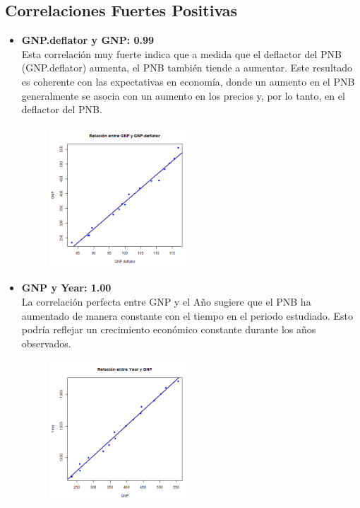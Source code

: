 \documentclass{article}
\begin{document}
    \subsection{Correlaciones Fuertes Positivas}
    
    \begin{itemize}
        \item \textbf{GNP.deflator y GNP: 0.99} \\
        Esta correlación muy fuerte indica que a medida que el deflactor del PNB (GNP.deflator) aumenta, el PNB también tiende a aumentar. Este resultado es coherente con las expectativas en economía, donde un aumento en el PNB generalmente se asocia con un aumento en los precios y, por lo tanto, en el deflactor del PNB.
        
        \begin{figure}[H]
            \centering
            \includegraphics[width=0.5\textwidth]{GraficosDispersion/GNP.deflator_vs_GNP.png}
            \label{fig:GNP.deflator_vs_GNP}
            \vspace{0.5cm} %
        \end{figure}
           

        \item \textbf{GNP y Year: 1.00} \\
        La correlación perfecta entre GNP y el Año sugiere que el PNB ha aumentado de manera constante con el tiempo en el periodo estudiado. Esto podría reflejar un crecimiento económico constante durante los años observados.
        
        \begin{figure}[H]
            \centering
            \includegraphics[width=0.5\textwidth]{GraficosDispersion/GNP_vs_Year.png}
            \label{fig:GNP_vs_Year}
            \vspace{0.5cm} %
        \end{figure}


\end{itemize}
\end{document}
